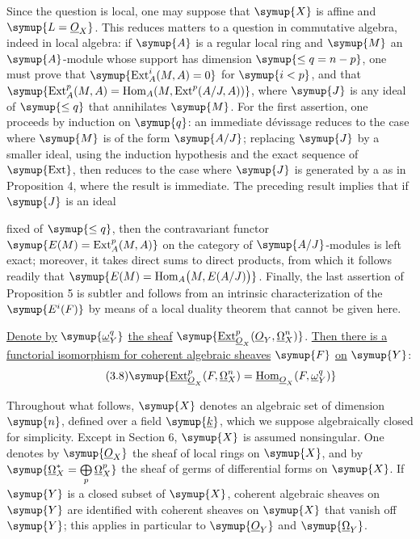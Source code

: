 Since the question is local, one may suppose that $\symup{X}$ is affine and
$\symup{L=\Osh_X}$. This reduces matters to a question in commutative algebra, indeed in
local algebra: if $\symup{A}$ is a regular local ring and $\symup{M}$ an $\symup{A}$-module whose
support has dimension $\symup{\leq q=n-p}$, one must prove that
$\symup{\operatorname{Ext}_{A}^{i}(M,A)=0}$ for $\symup{i<p}$, and that
$\symup{\operatorname{Ext}_{A}^{p}(M,A)
=\operatorname{Hom}_{A}\!\left(M,\operatorname{Ext}^{p}(A/J,A)\right)}$,
where $\symup{J}$ is any ideal of  $\symup{\leq q}$ that annihilates $\symup{M}$. For the
first assertion, one proceeds by induction on $\symup{q}$: an immediate dévissage reduces to
the case where $\symup{M}$ is of the form $\symup{A/J}$; replacing $\symup{J}$ by a smaller ideal, using the induction
hypothesis and the exact sequence of $\symup{\operatorname{Ext}}$, then reduces
to the case where $\symup{J}$ is generated by a  as in
Proposition 4, where the result is immediate. The preceding result implies that
if $\symup{J}$ is an ideal

fixed of  $\symup{\leq q}$, then the contravariant functor
$\symup{E(M)=\operatorname{Ext}_{A}^{p}(M,A)}$ on the category of $\symup{A/J}$-modules is left
exact; moreover, it takes direct sums to direct products, from which it follows
readily that
$\symup{E(M)=\operatorname{Hom}_{A}\bigl(M,E(A/J)\bigr)}$.
Finally, the last assertion of Proposition 5 is subtler and follows from an
intrinsic characterization of the $\symup{E^{i}(F)}$ by means of a local duality theorem
that cannot be given here.

 \uline{Denote by} $\symup{\underline{\omega}_Y^{q}}$ \uline{the sheaf}
$\symup{\Extsh_{\Osh_X}^{p}(\Osh_Y,\underline{\Omega}_X^{n})}$. \uline{Then there is a functorial isomorphism for coherent algebraic sheaves}
$\symup{F}$ \uline{on} $\symup{Y}$:
\begin{equation}\tag{3.8}
  \symup{\Extsh_{\Osh_X}^{p}(F,\underline{\Omega}_X^{n})
  =\Homsh_{\Osh_X}(F,\underline{\omega}_Y^{q})}
\end{equation}


Throughout what follows, $\symup{X}$ denotes an algebraic set of dimension $\symup{n}$, defined
over a field $\symup{\underline{k}}$, which we suppose algebraically closed for simplicity. Except
in Section 6, $\symup{X}$ is assumed nonsingular. One denotes by $\symup{\Osh_X}$ the sheaf of
local rings on $\symup{X}$, and by
$\symup{\underline{\Omega}_X^{*}=\bigoplus\limits_p\underline{\Omega}_X^{p}}$
the sheaf of germs of differential forms on $\symup{X}$. If $\symup{Y}$ is a closed subset of $\symup{X}$, coherent algebraic sheaves on
$\symup{Y}$ are identified with coherent sheaves on $\symup{X}$ that vanish off $\symup{Y}$; this
applies in particular to $\symup{\Osh_Y}$ and $\symup{\underline{\Omega}_Y}$.


